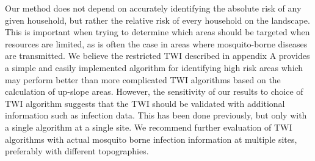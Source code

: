 \documentclass{article}\usepackage[]{graphicx}\usepackage[]{color}
\begin{document}
Our method does not depend on accurately identifying the absolute risk of any given household, but rather the relative risk of every household on the landscape.  This is important when trying to determine which areas should be targeted when resources are limited, as is often the case in areas where mosquito-borne diseases are transmitted. We believe the restricted TWI described in appendix A provides a simple and easily implemented algorithm for identifying high risk areas which may perform better than more complicated TWI algorithms based on the calculation of up-slope areas.  However, the sensitivity of our results to choice of TWI algorithm suggests that the TWI should be validated with additional information such as infection data.  This has been done previously\cite{Cohen2008, Cohen2010},  but only with a single algorithm at a single site.  We recommend further evaluation of TWI algorithms with actual mosquito borne infection information at multiple sites, preferably with different topographies.\\


\printbibliography
\end{document}
